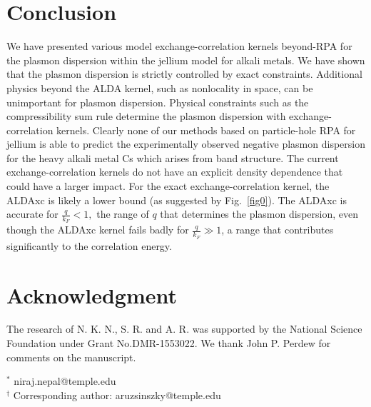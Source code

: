\documentclass[aps,amsmath,amssymb, preprint, 12pt]{revtex4-1}
\begin{document}
\section{Conclusion}
We have presented various model exchange-correlation kernels beyond-RPA for the plasmon dispersion within the jellium model for alkali metals. We have shown that the plasmon dispersion is strictly controlled by exact constraints. Additional physics beyond the ALDA kernel, such as nonlocality in space, can be unimportant for plasmon dispersion. Physical constraints such as the compressibility sum rule determine the plasmon dispersion with exchange-correlation kernels. Clearly none of our methods based on particle-hole RPA for jellium is able to predict the experimentally observed negative plasmon dispersion for the heavy alkali metal Cs which arises from band structure. The current exchange-correlation kernels do not have an explicit density dependence that could have a larger impact. For the exact exchange-correlation kernel, the ALDAxc is likely a lower bound (as suggested by Fig.~\ref{fig0}). The ALDAxc is accurate for  \( \frac{q}{k_{F}}<1, \)  the range of  \( q \)  that determines the plasmon dispersion, even though the ALDAxc kernel fails badly for  \( \frac{q}{k_{F}} \gg 1 \), a range that contributes significantly to the correlation energy.



\section{Acknowledgment}
 
The research of N. K. N., S. R. and A. R. was supported by the National Science Foundation under Grant {\fontsize{10pt}{12.0pt}\selectfont No.DMR-1553022}. We thank John P. Perdew for comments on the manuscript.

\noindent$^*$ niraj.nepal@temple.edu\\
$^\dagger$ Corresponding author: aruzsinszky@temple.edu\\
\end{document}
